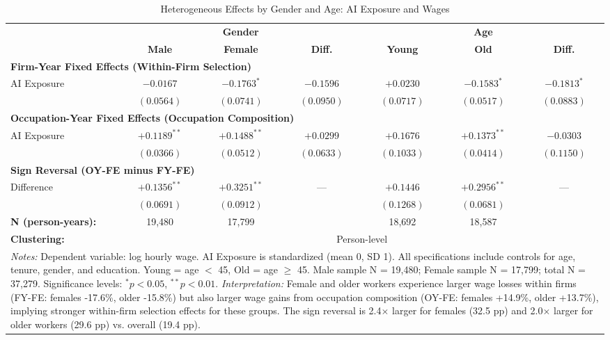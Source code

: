 \begin{table}[htbp]
\centering
\caption{Heterogeneous Effects by Gender and Age: AI Exposure and Wages}
\label{tab:heterogeneous_effects}
\small
\begin{tabular}{lcccccc}
\toprule
& \multicolumn{3}{c}{\textbf{Gender}} & \multicolumn{3}{c}{\textbf{Age}} \\
\cmidrule(lr){2-4} \cmidrule(lr){5-7}
& \textbf{Male} & \textbf{Female} & \textbf{Diff.} & \textbf{Young} & \textbf{Old} & \textbf{Diff.} \\
\midrule
\multicolumn{7}{l}{\textbf{Firm-Year Fixed Effects (Within-Firm Selection)}} \\
AI Exposure & $-0.0167$ & $-0.1763^*$ & $-0.1596$ & $+0.0230$ & $-0.1583^*$ & $-0.1813^*$ \\
& $(0.0564)$ & $(0.0741)$ & $(0.0950)$ & $(0.0717)$ & $(0.0517)$ & $(0.0883)$ \\
\midrule
\multicolumn{7}{l}{\textbf{Occupation-Year Fixed Effects (Occupation Composition)}} \\
AI Exposure & $+0.1189^{**}$ & $+0.1488^{**}$ & $+0.0299$ & $+0.1676$ & $+0.1373^{**}$ & $-0.0303$ \\
& $(0.0366)$ & $(0.0512)$ & $(0.0633)$ & $(0.1033)$ & $(0.0414)$ & $(0.1150)$ \\
\midrule
\multicolumn{7}{l}{\textbf{Sign Reversal (OY-FE minus FY-FE)}} \\
Difference & $+0.1356^{**}$ & $+0.3251^{**}$ & --- & $+0.1446$ & $+0.2956^{**}$ & --- \\
& $(0.0691)$ & $(0.0912)$ & & $(0.1268)$ & $(0.0681)$ & \\
\midrule
\textbf{N (person-years):} & 19,480 & 17,799 & & 18,692 & 18,587 & \\
\textbf{Clustering:} & \multicolumn{6}{c}{Person-level} \\
\bottomrule
\multicolumn{7}{p{\textwidth}}{\footnotesize \textit{Notes:}
Dependent variable: log hourly wage. AI Exposure is standardized (mean 0, SD 1).
All specifications include controls for age, tenure, gender, and education.
Young = age $<$ 45, Old = age $\geq$ 45.
Male sample N = 19,480; Female sample N = 17,799; total N = 37,279.
Significance levels: $^* p<0.05$, $^{**} p<0.01$.
\textit{Interpretation:} Female and older workers experience larger wage losses within firms (FY-FE: females -17.6\%, older -15.8\%)
but also larger wage gains from occupation composition (OY-FE: females +14.9\%, older +13.7\%), implying stronger within-firm selection effects
for these groups. The sign reversal is 2.4$\times$ larger for females (32.5 pp) and 2.0$\times$ larger for older workers (29.6 pp) vs. overall (19.4 pp).
}
\end{tabular}
\end{table}
